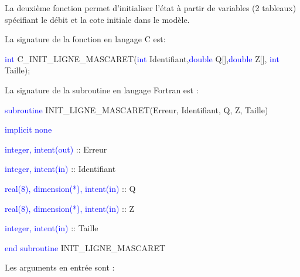 \documentclass[a4paper,11pt]{article}
\begin{document}
 La deuxi\`eme fonction permet d'initialiser l'\'etat \`a partir de variables (2 tableaux) sp\'ecifiant le d\'ebit et la cote initiale dans le mod\`ele.
 
 \vspace{0.5cm}
 
 La signature de la fonction en langage C est:
 
 \vspace{0.5cm}
 
 \textcolor{blue}{int} C\_INIT\_LIGNE\_MASCARET(\textcolor{blue}{int} Identifiant,\textcolor{blue}{double} Q[],\textcolor{blue}{double} Z[], \textcolor{blue}{int} Taille);
 
 \vspace{0.5cm} 
 
 La signature de la subroutine en langage Fortran est :
 
 \vspace{0.5cm}
 
    \textcolor{blue}{subroutine} INIT\_LIGNE\_MASCARET(Erreur, Identifiant, Q, Z, Taille)
    
        \hspace{1cm}\textcolor{blue}{implicit none}                 
        
        \hspace{1cm} \textcolor{blue}{integer, intent(out)} :: Erreur
        
        \hspace{1cm} \textcolor{blue}{integer, intent(in)}  :: Identifiant
        
        \hspace{1cm} \textcolor{blue}{real(8), dimension(*), intent(in)} :: Q
        
        \hspace{1cm} \textcolor{blue}{real(8), dimension(*), intent(in)} :: Z
        
        \hspace{1cm} \textcolor{blue}{integer, intent(in)}  :: Taille
        
    \textcolor{blue}{end subroutine} INIT\_LIGNE\_MASCARET

 \vspace{0.5cm}
 
 Les arguments en entr\'ee sont :
 
 \vspace{0.5cm}
 
\end{document}
